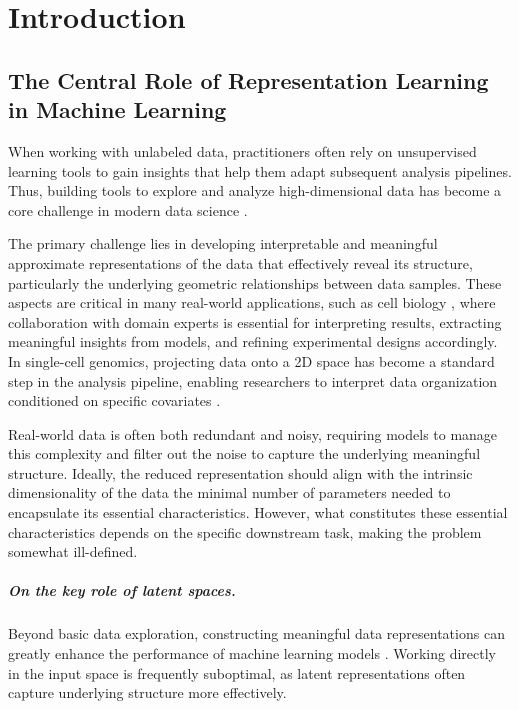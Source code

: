 \chapter{Introduction}\label{chap:intro}

\minitoc

\section{The Central Role of Representation Learning in Machine Learning}

When working with unlabeled data, practitioners often rely on unsupervised learning tools to gain insights that help them adapt subsequent analysis pipelines. Thus, building tools to explore and analyze high-dimensional data has become a core challenge in modern data science \citep{donoho2000high, rudin2022interpretable}. 

The primary challenge lies in developing interpretable and meaningful approximate representations of the data that effectively reveal its structure, particularly the underlying geometric relationships between data samples. These aspects are critical in many real-world applications, such as cell biology \citep{regev2017human}, where collaboration with domain experts is essential for interpreting results, extracting meaningful insights from models, and refining experimental designs accordingly. In single-cell genomics, projecting data onto a 2D space \citep{kobak2019art, becht2019dimensionality} has become a standard step in the analysis pipeline, enabling researchers to interpret data organization conditioned on specific covariates \citep{wolf2018scanpy}.

Real-world data is often both redundant and noisy, requiring models to manage this complexity and filter out the noise to capture the underlying meaningful structure. Ideally, the reduced representation should align with the intrinsic dimensionality of the data \ie the minimal number of parameters needed to encapsulate its essential characteristics. However, what constitutes these essential characteristics depends on the specific downstream task, making the problem somewhat ill-defined.


\paragraph{On the key role of latent spaces.} 
Beyond basic data exploration, constructing meaningful data representations can greatly enhance the performance of machine learning models \citep{bengio2013representation}. Working directly in the input space is frequently suboptimal, as latent representations often capture underlying structure more effectively.

